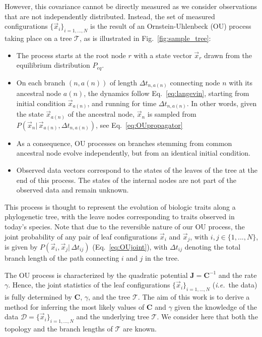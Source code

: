 \documentclass[preprint,amsmath,amssymb,superscriptaddress,showpacs,pre]{revtex4-1}
\newcommand{\ie}{\emph{i.e.}}
\def\vx{\vec x}
\begin{document}
However, this covariance cannot be directly measured as we consider observations that are not independently distributed.
Instead, the set of measured configurations $\{\vx_i\}_{i=1,...,N}$ is the result of an Ornstein-Uhlenbeck (OU) process taking place on a tree $\mathcal{T}$, as is illustrated in Fig.~\ref{fig:sample_tree}:
\begin{itemize}
    \item The process starts at the root node $r$ with a state vector $\vx_r$ drawn from the equilibrium distribution $P_{eq}$.
    \item On each branch $(n,a(n))$ of length $\Delta t_{n,a(n)}$ connecting node $n$ with its ancestral node $a(n)$, the dynamics follow Eq.~\eqref{eq:langevin}, starting from initial condition $\vx_{a(n)}$, and running for time $\Delta t_{n,a(n)}$. In other words, given the state $\vx_{a(n)}$ of the ancestral node, $\vx_n$ is sampled from $P(\vx_n |\, \vx_{a(n)}, \Delta t_{n,a(n)})$, see Eq.~\eqref{eq:OUpropagator}
    \item As a consequence, OU processes on branches stemming from common ancestral node evolve independently, but from an identical initial condition.
    \item Observed data vectors correspond to the states of the leaves of the tree at the end of this process. The states of the internal nodes are not part of the observed data and remain unknown. 
\end{itemize}
This process is thought to represent the evolution of biologic traits along a phylogenetic tree, with the leave nodes corresponding to traits observed in today's species. Note that due to the reversible nature of our OU process, the joint probability of any pair of leaf configurations $\vx_i$ and $\vx_j$, with $i,j\in\{1,...,N\}$, is given by  $P(\vx_i,\vx_j|\,\Delta t_{ij})$ (Eq.~\eqref{eq:OUjoint}), with $\Delta t_{ij}$ denoting the total branch length of the path connecting $i$ and $j$ in the tree.

The OU process is characterized by the quadratic potential $\bm J = \bm C^{-1}$ and the rate $\gamma$. 
Hence, the joint statistics of the leaf configurations $\{\vx_i\}_{i=1,...,N}$ (\ie~the data) is fully determined by $\bm C$, $\gamma$, and the tree $\mathcal{T}$. 
The aim of this work is to derive a method for inferring the most likely values of $\bm C$ and $\gamma$ given the knowledge of the data $\mathcal{D}=\{\vx_i\}_{i=1,...,N}$ and the underlying tree $\mathcal{T}$. We consider here that both the topology and the branch lengths of $\mathcal{T}$ are known. 
\end{document}
